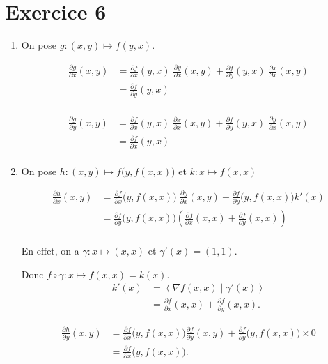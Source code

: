 \part{Exercice 6}

\begin{enumerate}
	\item On pose $g : (x,y) \mapsto f(y, x)$.

		\begin{align*}
			\frac{\partial g}{\partial x}(x,y) &= \frac{\partial f}{\partial x}(y,x)\;\frac{\partial y}{\partial x}(x,y) + \frac{\partial f}{\partial y}(y,x)\;\frac{\partial x}{\partial x}(x,y)\\
			&= \frac{\partial f}{\partial y}(y,x) \\
		\end{align*}

		\begin{align*}
			\frac{\partial g}{\partial y}(x,y) &= \frac{\partial f}{\partial x}(y,x)\; \frac{\partial x}{\partial x}(x,y) + \frac{\partial f}{\partial y}(y,x)\; \frac{\partial y}{\partial x}(x,y) \\
			&= \frac{\partial f}{\partial x}(y,x) \\
		\end{align*}
	\item On pose $h: (x,y) \mapsto f\big(y, f(x,x)\big)$ et $k : x \mapsto f(x,x)$

		\begin{align*}
			\frac{\partial h}{\partial x}(x,y) &= \frac{\partial f}{\partial x}\big(y, f(x,x)\big)\;\frac{\partial y}{\partial x}(x,y) + \frac{\partial f}{\partial y}\big(y, f(x,x)\big)k'(x)\\
			&= \frac{\partial f}{\partial y}\big(y, f(x,x)\big)  \left( \frac{\partial f}{\partial x}(x,x) + \frac{\partial f}{\partial y}(x,x) \right)\\
		\end{align*}

		En effet, on a $\gamma: x \mapsto (x,x)$ et $\gamma'(x) = (1,1)$.

		Donc $f \circ \gamma : x \mapsto f(x,x) = k(x)$.
		\begin{align*}
			k'(x) &= \left<\nabla f(x,x)  \mid \gamma'(x) \right> \\
			&= \frac{\partial f}{\partial x}(x,x) + \frac{\partial f}{\partial y}(x,x).
		\end{align*}

		\begin{align*}
			\frac{\partial h}{\partial y}(x,y) &= \frac{\partial f}{\partial x}\big(y, f(x,x)\big) \frac{\partial f}{\partial y}(x,y) + \frac{\partial f}{\partial y}\big(y, f(x,x)\big) \times 0\\
			&= \frac{\partial f}{\partial x}\big(y, f(x,x)\big). \\
		\end{align*}
\end{enumerate}
